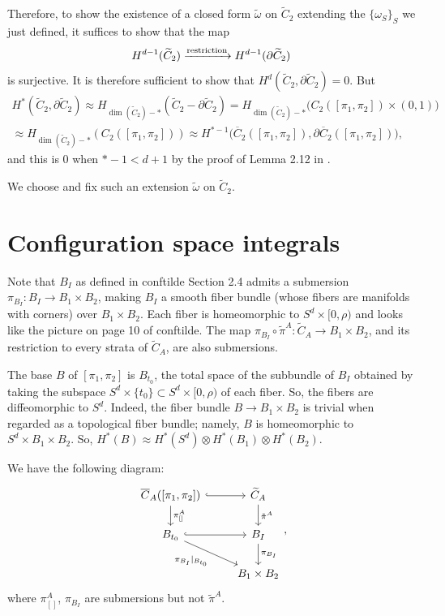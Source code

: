 \documentclass[11pt]{article}
\theoremstyle{definition}
\theoremstyle{remark}
\def\wt#1{\widetilde{#1}}
\def\ov#1{\overline{#1}}
\def\tn#1{\textnormal{#1}}
\begin{document}
Therefore, to show the existence of a closed form $\wt{\omega}$ on $\wt{C}_2$ extending the $\{\omega_S\}_S$ we just defined, 
it suffices to show that the map 
$$H^{d-1}(\wt{C}_2)\xrightarrow{\tn{restriction}}H^{d-1}(\partial\wt{C}_2)$$
is surjective. 
It is therefore sufficient to show that $H^d(\wt{C}_2,\partial\wt{C}_2)=0$. But 
\begin{align*}
H^*(\wt{C}_2,\partial\wt{C}_2)\approx
H_{\dim(\wt{C}_2)-*}(\wt{C}_2-\partial\wt{C}_2)=
H_{\dim(\wt{C}_2)-*}\big(C_2([\pi_1,\pi_2])\times (0,1)\big)\\
\approx
H_{\dim(\wt{C}_2)-*}({C}_2([\pi_1,\pi_2]))
\approx H^{*-1}\big(\ov{C}_2([\pi_1,\pi_2]),\partial\ov{C}_2([\pi_1,\pi_2])\big), 
\end{align*}
and this is 0 when $*-1<d+1$ by the proof of Lemma 2.12 in \cite{WatanabeAddendum}. 

We choose and fix such an extension $\wt\omega$ on $\wt{C}_2$. 

\section{Configuration space integrals}

Note that $B_I$ as defined in conftilde Section 2.4 admits a submersion $\pi_{B_I}:B_I\to B_1\times B_2$, making $B_I$ a smooth fiber bundle (whose fibers are manifolds with corners) over $B_1\times B_2$. Each fiber is homeomorphic to $S^d\times [0,\rho)$ and looks like the picture on page 10 of conftilde. 
The map $\pi_{B_I}\circ\tilde{\pi}^A:\wt{C}_A\to B_1\times B_2$, and its restriction to every strata of $\wt{C}_A$, are also submersions. 

The base $B$ of $[\pi_1,\pi_2]$ is $B_{t_0}$, 
the total space of the subbundle of $B_I$ obtained by taking the subspace $S^d\times \{t_0\}\subset S^d\times[0,\rho)$ of each fiber. So, the fibers are diffeomorphic to $S^d$. 
Indeed, the fiber bundle $B\to B_1\times B_2$ is trivial when regarded as a topological fiber bundle; namely, $B$ is homeomorphic to $S^d\times B_1\times B_2$. So, 
$H^*(B)\approx H^*(S^d)\otimes H^*(B_1)\otimes H^*(B_2)$. 



We have the following diagram: 
\[
\begin{tikzcd}
\ov{C}_A([\pi_1,\pi_2])\rar[hook]\dar["\pi_{[]}^A"] & \wt{C}_A\dar["\tilde\pi^A"]\\
B_{t_0}\rar[hook]\drar["\pi_{B_I}|_{B_{t_0}}"'] & B_I\dar["\pi_{B_I}"] \\
 & B_1\times B_2
\end{tikzcd},
\]
where $\pi_{[]}^A$, $\pi_{B_I}$ are submersions but not $\tilde\pi^A$. 
\end{document}
